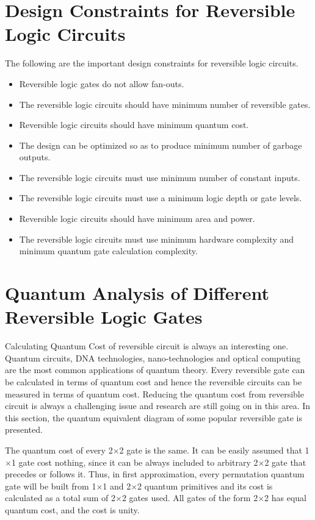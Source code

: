 \section{Design Constraints for Reversible Logic Circuits}
The following are the important design constraints for reversible logic circuits.

\begin{itemize}
	\item Reversible logic gates do not allow fan-outs.
	\item The reversible logic circuits should have minimum number of reversible gates.
	\item Reversible logic circuits should have minimum quantum cost.
	\item The design can be optimized so as to produce minimum number of garbage outputs.
	\item The reversible logic circuits must use minimum number of constant inputs.
	\item The reversible logic circuits must use a minimum logic depth or gate levels.
	\item Reversible logic circuits should have minimum area and power.
	\item The reversible logic circuits must use minimum hardware complexity and minimum quantum gate calculation complexity.
\end{itemize}

\section{Quantum Analysis of Different Reversible Logic Gates}
Calculating Quantum Cost of reversible circuit is always an interesting one. Quantum circuits, DNA technologies, nano-technologies and optical computing are the most common applications of quantum theory. Every reversible gate can be calculated in terms of quantum cost and hence the reversible circuits can be measured in terms of quantum cost. Reducing the quantum cost from reversible circuit is always a challenging issue and research are still going on in this area. In this section, the quantum equivalent diagram of some popular reversible gate is presented.

\begin{property}\textnormal{
	The quantum cost of every 2$\times$2 gate is the same. It can be easily assumed that 1$\times$1 gate cost nothing, since it can be always included to arbitrary 2$\times$2 gate that precedes or follows it. Thus, in first approximation, every permutation quantum gate will be built from 1$\times$1 and 2$\times$2 quantum primitives and its cost is calculated as a total sum of 2$\times$2 gates used. All gates of the form 2$\times$2 has equal quantum cost, and the cost is unity.}
\end{property}

